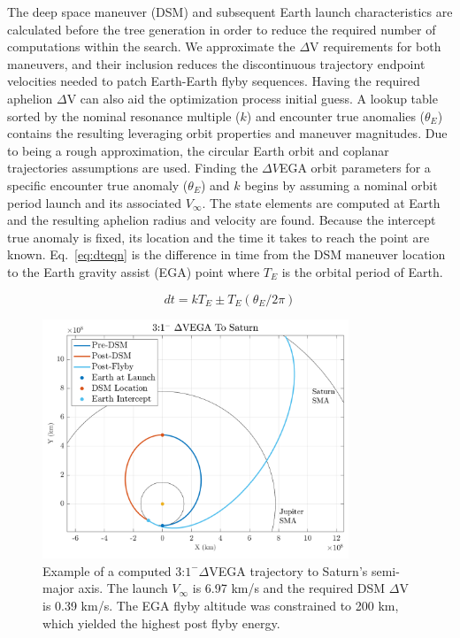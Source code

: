 \documentclass[letterpaper, preprint, paper,11pt]{AAS}	%
\begin{document}
The deep space maneuver (DSM) and subsequent Earth launch characteristics are calculated before the tree generation in order to reduce the required number of computations within the search. We approximate the $\Delta$V requirements for both maneuvers, and their inclusion reduces the discontinuous trajectory endpoint velocities needed to patch Earth-Earth flyby sequences. Having the required aphelion $\Delta$V can also aid the optimization process initial guess. A lookup table sorted by the nominal resonance multiple ($k$) and encounter true anomalies ($\theta_{E}$) contains the resulting leveraging orbit properties and maneuver magnitudes. Due to being a rough approximation, the circular Earth orbit and coplanar trajectories assumptions are used. Finding the $\Delta V$EGA orbit parameters for a specific encounter true anomaly ($\theta_{E}$) and $k$ begins by assuming a nominal orbit period launch and its associated $V_\infty$. The state elements are computed at Earth and the resulting aphelion radius and velocity are found. Because the intercept true anomaly is fixed, its location and the time it takes to reach the point are known. Eq.~\eqref{eq:dteqn} is the difference in time from the DSM maneuver location to the Earth gravity assist (EGA) point where $T_E$ is the orbital period of Earth.

\begin{equation}
	\label{eq:dteqn}
	dt = kT_E \pm T_E(\theta_E/2\pi)
\end{equation}


\begin{figure}[htb]
	\centering\includegraphics[width=3.6in]{./fig/dsmmatlab}
	\caption{Example of a computed 3:$1^{-} \Delta$VEGA trajectory to Saturn's semi-major axis. The launch $V_\infty$ is 6.97 km/s and the required DSM $\Delta$V is 0.39 km/s. The EGA flyby altitude was constrained to 200 km, which yielded the highest post flyby energy.}
	\label{fig:dsmmatlab}
\end{figure}
\end{document}
